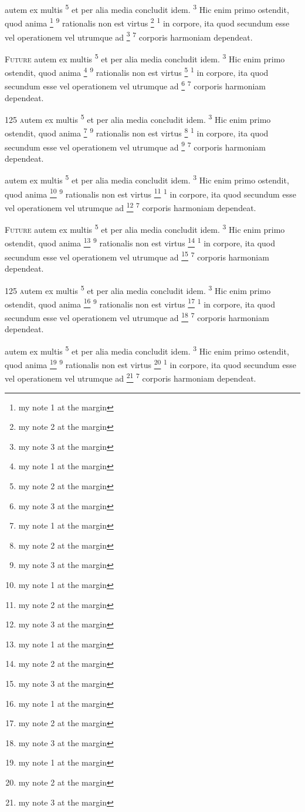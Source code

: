 \documentclass[twoside,12pt]{book}
\newcommand{\blGetVerse}[1]{%
\setcounter{footnote}{0}%
\textsuperscript{#1}%
}
\newcommand{\blGetVerseX}[2]{%
\footnote{#2}\blGetVerse{#1}%
}
\newcommand{\blIniChar}[1]{%
\blSetAcorn\selectfont{#1}%
}
\newcommand{\blIniWord}[1]{%
\blSetRothenburgDecorative\selectfont{#1}%
}
\newcommand{\blIniNum}[1]{%
\blSetDSRomantiques\selectfont{#1}%
}
\begin{document}
\lettrine{\blIniChar{FU}}{\blIniWord{turo}}
autem ex multis \blGetVerse{5}et per alia media concludit idem. \blGetVerse{3}Hic enim primo ostendit, quod anima \blGetVerseX{9}{my note 1 at the margin}rationalis 
non est virtus \blGetVerseX{1}{my note 2 at the margin}in corpore, ita quod secundum esse vel
operationem vel utrumque ad \blGetVerseX{7}{my note 3 at the margin}corporis harmoniam dependeat.

\lettrine{\blIniNum{150}}{Future}
autem ex multis \blGetVerse{5}et per alia media concludit idem. \blGetVerse{3}Hic enim primo ostendit, quod anima \blGetVerseX{9}{my note 1 at the margin}rationalis 
non est virtus \blGetVerseX{1}{my note 2 at the margin}in corpore, ita quod secundum esse vel
operationem vel utrumque ad \blGetVerseX{7}{my note 3 at the margin}corporis harmoniam dependeat.

\lettrine{125 }
autem ex multis \blGetVerse{5}et per alia media concludit idem. \blGetVerse{3}Hic enim primo ostendit, quod anima \blGetVerseX{9}{my note 1 at the margin}rationalis 
non est virtus \blGetVerseX{1}{my note 2 at the margin}in corpore, ita quod secundum esse vel
operationem vel utrumque ad \blGetVerseX{7}{my note 3 at the margin}corporis harmoniam dependeat.

\lettrine{\blIniChar{FU}}{\blIniWord{turo}}
autem ex multis \blGetVerse{5}et per alia media concludit idem. \blGetVerse{3}Hic enim primo ostendit, quod anima \blGetVerseX{9}{my note 1 at the margin}rationalis 
non est virtus \blGetVerseX{1}{my note 2 at the margin}in corpore, ita quod secundum esse vel
operationem vel utrumque ad \blGetVerseX{7}{my note 3 at the margin}corporis harmoniam dependeat.

\lettrine{\blIniNum{150}}{Future}
autem ex multis \blGetVerse{5}et per alia media concludit idem. \blGetVerse{3}Hic enim primo ostendit, quod anima \blGetVerseX{9}{my note 1 at the margin}rationalis 
non est virtus \blGetVerseX{1}{my note 2 at the margin}in corpore, ita quod secundum esse vel
operationem vel utrumque ad \blGetVerseX{7}{my note 3 at the margin}corporis harmoniam dependeat.

\lettrine{125 }
autem ex multis \blGetVerse{5}et per alia media concludit idem. \blGetVerse{3}Hic enim primo ostendit, quod anima \blGetVerseX{9}{my note 1 at the margin}rationalis 
non est virtus \blGetVerseX{1}{my note 2 at the margin}in corpore, ita quod secundum esse vel
operationem vel utrumque ad \blGetVerseX{7}{my note 3 at the margin}corporis harmoniam dependeat.

\lettrine{\blIniChar{FU}}{\blIniWord{turo}}
autem ex multis \blGetVerse{5}et per alia media concludit idem. \blGetVerse{3}Hic enim primo ostendit, quod anima \blGetVerseX{9}{my note 1 at the margin}rationalis 
non est virtus \blGetVerseX{1}{my note 2 at the margin}in corpore, ita quod secundum esse vel
operationem vel utrumque ad \blGetVerseX{7}{my note 3 at the margin}corporis harmoniam dependeat.
\end{document}
